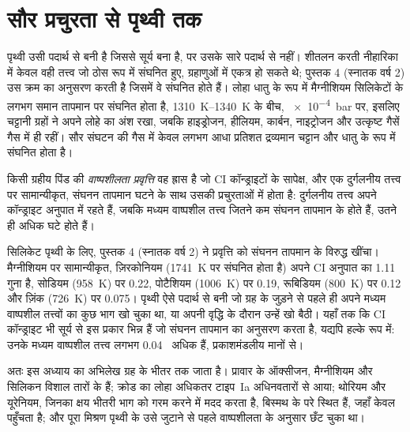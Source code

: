 \section{सौर प्रचुरता से पृथ्वी तक}\label{sec:b3:origin-of-elements:earth}

पृथ्वी उसी पदार्थ से बनी है जिससे सूर्य बना है, पर उसके सारे
पदार्थ से नहीं। शीतलन करती नीहारिका में केवल वही तत्त्व जो
ठोस रूप में संघनित हुए, ग्रहाणुओं में एकत्र हो सकते थे; पुस्तक 4 (स्नातक वर्ष 2) उस
क्रम का अनुसरण करती है जिसमें वे संघनित होते हैं। लोहा धातु के रूप में मैग्नीशियम सिलिकेटों के
लगभग समान तापमान पर संघनित होता है, \qtyrange{1310}{1340}{K} के बीच, \qty{e-4}{bar} पर,
इसलिए चट्टानी ग्रहों ने अपने लोहे का अंश रखा, जबकि
हाइड्रोजन, हीलियम, कार्बन, नाइट्रोजन और उत्कृष्ट गैसें गैस में ही रहीं।
सौर संघटन की गैस में केवल लगभग आधा प्रतिशत द्रव्यमान
चट्टान और धातु के रूप में संघनित होता है।

\begin{definition}[वाष्पशीलता प्रवृत्ति]\label{def:b3:origin-of-elements:volatility}
किसी ग्रहीय पिंड की \emph{वाष्पशीलता प्रवृत्ति} वह ह्रास है
जो CI कॉन्ड्राइटों के सापेक्ष, और एक दुर्गलनीय तत्त्व पर सामान्यीकृत,
संघनन तापमान घटने के साथ उसकी प्रचुरताओं में होता है:
दुर्गलनीय तत्त्व अपने कॉन्ड्राइट अनुपात में रहते हैं,
जबकि मध्यम वाष्पशील तत्त्व जितने कम संघनन तापमान के होते हैं,
उतने ही अधिक घटे होते हैं।
\end{definition}

सिलिकेट पृथ्वी के लिए, पुस्तक 4 (स्नातक वर्ष 2) ने प्रवृत्ति को संघनन
तापमान के विरुद्ध खींचा। मैग्नीशियम पर सामान्यीकृत, ज़िरकोनियम
(\qty{1741}{K} पर संघनित होता है) अपने CI अनुपात का \num{1.11} गुना है,
सोडियम (\qty{958}{K}) पर \num{0.22}, पोटैशियम
(\qty{1006}{K}) पर \num{0.19}, रूबिडियम (\qty{800}{K}) पर \num{0.12}
और ज़िंक (\qty{726}{K}) पर \num{0.075}। पृथ्वी ऐसे पदार्थ से बनी जो
ग्रह के जुड़ने से पहले ही अपने मध्यम वाष्पशील तत्त्वों का कुछ भाग खो चुका था,
या अपनी वृद्धि के दौरान उन्हें खो बैठी। यहाँ तक कि CI
कॉन्ड्राइट भी सूर्य से इस प्रकार भिन्न हैं जो संघनन
तापमान का अनुसरण करता है, यद्यपि हल्के रूप में: उनके मध्यम वाष्पशील तत्त्व
लगभग \num{0.04}~ अधिक हैं, प्रकाशमंडलीय मानों से।

अतः इस अध्याय का अभिलेख ग्रह के भीतर तक जाता है। प्रावार के
ऑक्सीजन, मैग्नीशियम और सिलिकन विशाल तारों के  हैं;
क्रोड का लोहा अधिकतर टाइप~Ia अधिनवतारों से आया;
थोरियम और यूरेनियम, जिनका क्षय भीतरी भाग को गरम करने में मदद करता है,
बिस्मथ के परे स्थित हैं, जहाँ केवल  पहुँचता है; और पूरा मिश्रण
पृथ्वी के उसे जुटाने से पहले वाष्पशीलता के अनुसार छँट चुका था।


